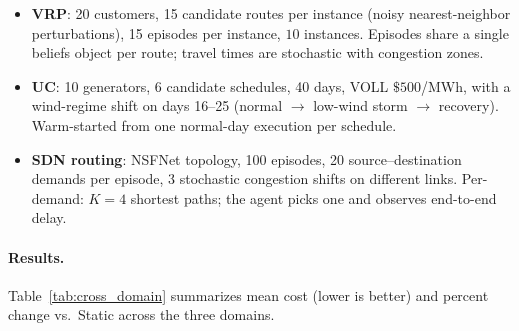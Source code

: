\documentclass[opre,dblanonrev]{informs4}
\begin{document}
\begin{APPENDICES}
\begin{itemize}[leftmargin=1.2em,itemsep=0.2em]
\item \textbf{VRP}: 20 customers, 15 candidate routes per instance
  (noisy nearest-neighbor perturbations), 15 episodes per instance,
  $10$ instances. Episodes share a single beliefs object per route;
  travel times are stochastic with congestion zones.
\item \textbf{UC}: 10 generators, 6 candidate schedules, 40 days,
  VOLL $\$500$/MWh, with a wind-regime shift on days 16--25
  (normal $\to$ low-wind storm $\to$ recovery). Warm-started from
  one normal-day execution per schedule.
\item \textbf{SDN routing}: NSFNet topology, 100 episodes, 20
  source--destination demands per episode, 3 stochastic congestion
  shifts on different links. Per-demand: $K{=}4$ shortest paths;
  the agent picks one and observes end-to-end delay.
\end{itemize}

\paragraph{Results.}
Table~\ref{tab:cross_domain} summarizes mean cost (lower is better)
and percent change vs.\ Static across the three domains.


\end{APPENDICES}
\end{document}
